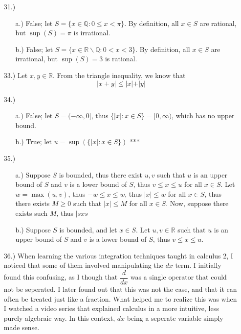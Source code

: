 \documentclass[12pt]{article}
\begin{document}
\begin{itemize}
\begin{itemize}
        \item [b.)] ***
    \end{itemize}

    \item [31.)] \begin{itemize}
        \item [a.)] False; let $S=\{x\in\mathbb{Q}:0\leq x<\pi\}$. By definition, all $x\in S$ are rational, but $\sup(S)=\pi$ is irrational.

        \item [b.)] False; let $S=\{x\in\mathbb{R}\backslash\mathbb{Q}:0<x<3\}$. By definition, all $x\in S$ are irrational, but $\sup(S)=3$ is rational.
    \end{itemize}

    \item [33.)] Let $x,y\in\mathbb{R}$. From the triangle inequality, we know that
    \[\vert x+y\vert\leq\vert x\vert+\vert y\vert\]

    \item [34.)] \begin{itemize}
        \item [a.)] False; let $S=(-\infty,0]$, thus $\{\vert x\vert:x\in S\}=[0,\infty)$, which has no upper bound.

        \item [b.)] True; let $u=\sup(\{\vert x\vert:x\in S\})$ ***
    \end{itemize}

    \item [35.)] \begin{itemize}
        \item [a.)] Suppose $S$ is bounded, thus there exist $u,v$ such that $u$ is an upper bound of $S$ and $v$ is a lower bound of $S$, thus $v\leq x\leq u$ for all $x\in S$. Let $w=\max(u,v)$, thus $-w\leq x\leq w$, thus $\vert x\vert\leq w$ for all $x\in S$, thus there exists $M\geq0$ such that $\vert x\vert\leq M$ for all $x\in S$. Now, suppose there exists such $M$, thus $\vert sxs$

        \item [b.)] Suppose $S$ is bounded, and let $x\in S$. Let $u,v\in\mathbb{R}$ such that $u$ is an upper bound of $S$ and $v$ is a lower bound of $S$, thus $v\leq x\leq u$.
    \end{itemize}

    \item [36.)] When learning the various integration techniques taught in calculus 2, I noticed that some of them involved manipulating the $dx$ term. I initially found this confusing, as I though that $\dfrac{d}{dx}$ was a single operator that could not be seperated. I later found out that this was not the case, and that it can often be treated just like a fraction. What helped me to realize this was when I watched a video series that explained calculus in a more intuitive, less purely algebraic way. In this context, $dx$ being a seperate variable simply made sense.


\end{itemize}
\end{document}
